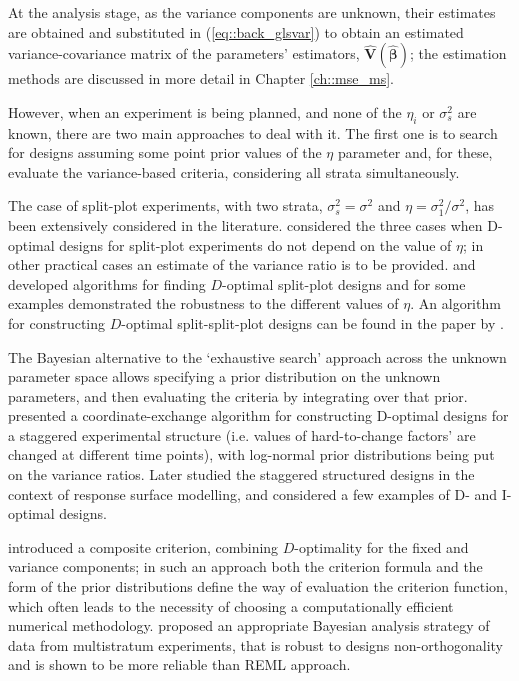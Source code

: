 At the analysis stage, as the variance components are unknown, their estimates are obtained and substituted in (\ref{eq::back_glsvar}) to obtain an estimated variance-covariance matrix of the parameters' estimators, $\bm{\hat{V}(\hat{\beta})}$; the estimation methods are discussed in more detail in Chapter \ref{ch::mse_ms}.

However, when an experiment is being planned, and none of the $\eta_{i}$ or $\sigma^2_{s}$ are known, there are two main approaches to deal with it. The first one is to search for designs assuming some point prior values of the $\eta$ parameter and, for these, evaluate the variance-based criteria, considering all strata simultaneously.

The case of split-plot experiments, with two strata, $\sigma^2_{s}=\sigma^2$ and $\eta=\sigma^2_{1}/\sigma^2$, has been extensively considered in the literature. \cite{Goos2001Doptimal} considered the three cases when D-optimal designs for split-plot experiments do not depend on the value of $\eta$; in other practical cases an estimate of the variance ratio is to be provided. \cite{Goos2003Doptimal} and \cite{Jones2007candidate} developed algorithms for finding $D$-optimal split-plot designs and for some examples demonstrated the robustness to the different values of $\eta$. An algorithm for constructing $D$-optimal split-split-plot designs can be found in the paper by \cite{Jones2009Doptimal}. 

The Bayesian alternative to the `exhaustive search' approach across the unknown parameter space allows specifying a prior distribution on the unknown parameters, and then evaluating the criteria by integrating over that prior. \cite{Arnouts2012staggered} presented a coordinate-exchange algorithm for constructing D-optimal designs for a staggered experimental structure (i.e. values of hard-to-change factors' are changed at different time points), with log-normal prior distributions being put on the variance ratios. Later \cite{Arnouts2015staggered} studied the staggered structured designs in the context of response surface modelling, and considered a few examples of D- and I-optimal designs.
 
\cite{Mylona2014optimal} introduced a composite criterion, combining $D$-optimality for the fixed and variance components; in such an approach both the criterion formula and the form of the prior distributions define the way of evaluation the criterion function, which often leads to the necessity of choosing a computationally efficient numerical methodology. \cite{Gilmour2009analysis} proposed an appropriate Bayesian analysis strategy of data from multistratum experiments, that is robust to designs non-orthogonality and is shown to be more reliable than REML approach.  

